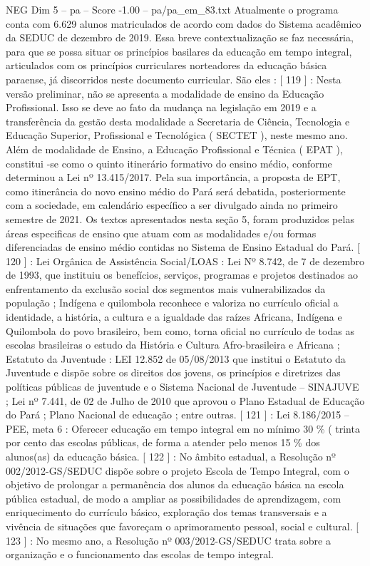 \begin{textsample}{NEG Dim 5 – pa – Score -1.00 – pa/pa\_em\_83.txt}
Atualmente o programa conta com 6.629 alunos matriculados de acordo com dados do Sistema acadêmico da SEDUC de dezembro de 2019.
Essa breve contextualização se faz necessária, para que se possa situar os princípios basilares da educação em tempo integral, articulados com os princípios curriculares norteadores da educação básica paraense, já discorridos neste documento curricular.
São eles : [ 119 ] : Nesta versão preliminar, não se apresenta a modalidade de ensino da Educação Profissional.
Isso se deve ao fato da mudança na legislação em 2019 e a transferência da gestão desta modalidade a Secretaria de Ciência, Tecnologia e Educação Superior, Profissional e Tecnológica ( SECTET ), neste mesmo ano.
Além de modalidade de Ensino, a Educação Profissional e Técnica ( EPAT ), constitui -se como o quinto itinerário formativo do ensino médio, conforme determinou a Lei nº 13.415/2017.
Pela sua importância, a proposta de EPT, como itinerância do novo ensino médio do Pará será debatida, posteriormente com a sociedade, em calendário específico a ser divulgado ainda no primeiro semestre de 2021.
Os textos apresentados nesta seção 5, foram produzidos pelas áreas especificas de ensino que atuam com as modalidades e/ou formas diferenciadas de ensino médio contidas no Sistema de Ensino Estadual do Pará. [ 120 ] : Lei Orgânica de Assistência Social/LOAS : Lei Nº 8.742, de 7 de dezembro de 1993, que instituiu os benefícios, serviços, programas e projetos destinados ao enfrentamento da exclusão social dos segmentos mais vulnerabilizados da população ; Indígena e quilombola reconhece e valoriza no currículo oficial a identidade, a história, a cultura e a igualdade das raízes Africana, Indígena e Quilombola do povo brasileiro, bem como, torna oficial no currículo de todas as escolas brasileiras o estudo da História e Cultura Afro-brasileira e Africana ; Estatuto da Juventude : LEI 12.852 de 05/08/2013 que institui o Estatuto da Juventude e dispõe sobre os direitos dos jovens, os princípios e diretrizes das políticas públicas de juventude e o Sistema Nacional de Juventude – SINAJUVE ; Lei nº 7.441, de 02 de Julho de 2010 que aprovou o Plano Estadual de Educação do Pará ; Plano Nacional de educação ; entre outras. [ 121 ] : Lei 8.186/2015 – PEE, meta 6 : Oferecer educação em tempo integral em no mínimo 30 \% ( trinta por cento das escolas públicas, de forma a atender pelo menos 15 \% dos alunos(as) da educação básica. [ 122 ] : No âmbito estadual, a Resolução nº 002/2012-GS/SEDUC dispõe sobre o projeto Escola de Tempo Integral, com o objetivo de prolongar a permanência dos alunos da educação básica na escola pública estadual, de modo a ampliar as possibilidades de aprendizagem, com enriquecimento do currículo básico, exploração dos temas transversais e a vivência de situações que favoreçam o aprimoramento pessoal, social e cultural. [ 123 ] : No mesmo ano, a Resolução nº 003/2012-GS/SEDUC trata sobre a organização e o funcionamento das escolas de tempo integral.

\end{textsample}
